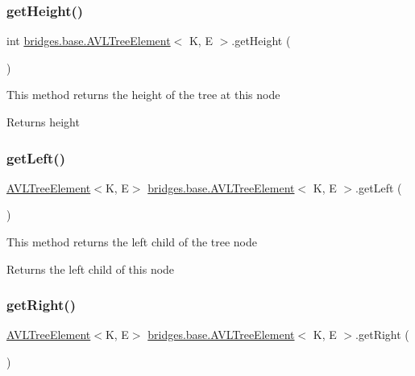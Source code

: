 \subsubsection{\texorpdfstring{getHeight()}{getHeight()}}
{\footnotesize\ttfamily int \mbox{\hyperlink{classbridges_1_1base_1_1_a_v_l_tree_element}{bridges.\+base.\+A\+V\+L\+Tree\+Element}}$<$ K, E $>$.get\+Height (\begin{DoxyParamCaption}{ }\end{DoxyParamCaption})}

This method returns the height of the tree at this node

\begin{DoxyReturn}{Returns}
height 
\end{DoxyReturn}
\mbox{\label{classbridges_1_1base_1_1_a_v_l_tree_element_a86f1329b19d2886ba7bf713e3844ecd6}} 
\subsubsection{\texorpdfstring{getLeft()}{getLeft()}}
{\footnotesize\ttfamily \mbox{\hyperlink{classbridges_1_1base_1_1_a_v_l_tree_element}{A\+V\+L\+Tree\+Element}}$<$K, E$>$ \mbox{\hyperlink{classbridges_1_1base_1_1_a_v_l_tree_element}{bridges.\+base.\+A\+V\+L\+Tree\+Element}}$<$ K, E $>$.get\+Left (\begin{DoxyParamCaption}{ }\end{DoxyParamCaption})}

This method returns the left child of the tree node

\begin{DoxyReturn}{Returns}
the left child of this node 
\end{DoxyReturn}
\mbox{\label{classbridges_1_1base_1_1_a_v_l_tree_element_aab93418ac19605f2c7c57aa38d110921}} 
\subsubsection{\texorpdfstring{getRight()}{getRight()}}
{\footnotesize\ttfamily \mbox{\hyperlink{classbridges_1_1base_1_1_a_v_l_tree_element}{A\+V\+L\+Tree\+Element}}$<$K, E$>$ \mbox{\hyperlink{classbridges_1_1base_1_1_a_v_l_tree_element}{bridges.\+base.\+A\+V\+L\+Tree\+Element}}$<$ K, E $>$.get\+Right (\begin{DoxyParamCaption}{ }\end{DoxyParamCaption})}


